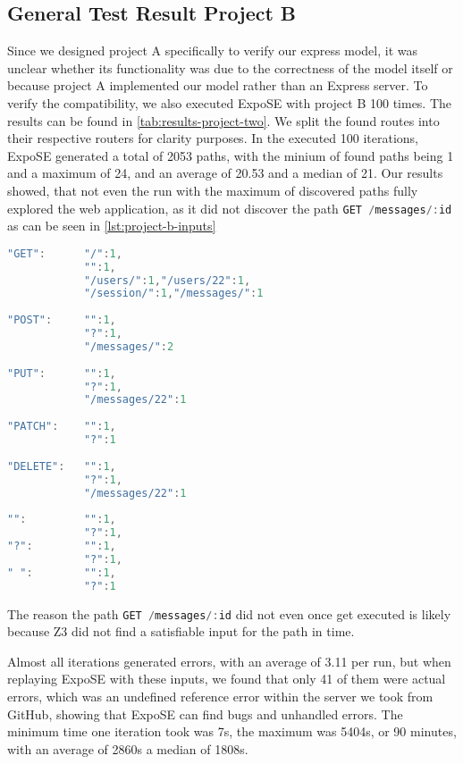 \FloatBarrier
\subsection{General Test Result Project B}

Since we designed project A specifically to verify our express model, it was unclear whether its functionality was due to the correctness of the model itself or because project A implemented our model rather than an Express server. To verify the compatibility, we also executed ExpoSE with project B 100 times.
The results can be found in \autoref{tab:results-project-two}.
We split the found routes into their respective routers for clarity purposes. 
In the executed 100 iterations, ExpoSE generated a total of 2053 paths, with the minium of found paths being 1 and a maximum of 24, and an average of 20.53 and a median of 21. 
Our results showed, that not even the run with the maximum of discovered paths fully explored the web application, as it did not discover the path
\lstinline[language=JavaScript]{GET /messages/:id} as can be seen in \autoref{lst:project-b-inputs}
\begin{lstlisting}[language=JavaScript, float, label={lst:project-b-inputs}, caption={[Generated Inputs for Project B]The inputs generated for project B, listed by the HTTP method, grouped by the router.}]
"GET":      "/":1,
            "":1,
            "/users/":1,"/users/22":1,
            "/session/":1,"/messages/":1
            
"POST":     "":1,
            "?":1,
            "/messages/":2
            
"PUT":      "":1,
            "?":1,
            "/messages/22":1
            
"PATCH":    "":1,
            "?":1
            
"DELETE":   "":1,
            "?":1,
            "/messages/22":1
            
"":         "":1,
            "?":1,
"?":        "":1,
            "?":1,
" ":        "":1,
            "?":1
\end{lstlisting}

The reason the path \lstinline[language=JavaScript]{GET /messages/:id} 
did not even once get executed is likely because Z3 did not find a satisfiable input for the  path in time.

Almost all iterations generated errors, with an average of 3.11 per run, but when replaying ExpoSE with these inputs, we found that only 41 of them were actual errors, which was an undefined reference error within the server we took from GitHub, showing that ExpoSE can find bugs and unhandled errors.
The minimum time one iteration took was 7s, the maximum was 5404s, or 90 minutes, with an average of 2860s a median of 1808s.


